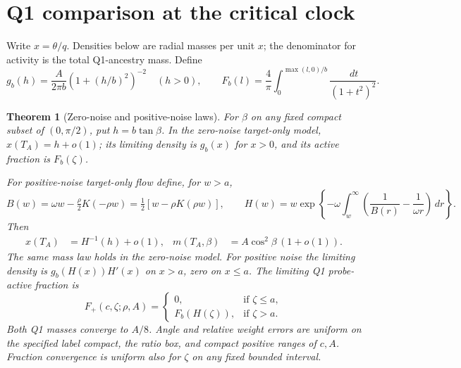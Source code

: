 \documentclass[11pt]{article}
\newtheorem{theorem}{Theorem}\newtheorem{lemma}{Lemma}
\newcommand{\dd}{\,d}\newcommand{\E}{\mathbb E}
\begin{document}
\section{Q1 comparison at the critical clock}\label{an04cfsv1:profiles}
Write \(x=\theta/q\). Densities below are radial masses per unit \(x\);
the denominator for activity is the total Q1-ancestry mass.
Define
\[
 g_b(h)=\frac{A}{2\pi b}\left(1+(h/b)^2\right)^{-2}\quad(h>0),
 \qquad
 F_b(l)=\frac4\pi\int_0^{\max(l,0)/b}\frac{\dd t}{(1+t^2)^2}.
\]
\begin{theorem}[Zero-noise and positive-noise laws]\label{an04cfsv1:laws}
For \(\beta\) on any fixed compact subset of \((0,\pi/2)\),
put \(h=b\tan\beta\). In the zero-noise target-only model,
\(x(T_A)=h+o(1)\); its limiting density is \(g_b(x)\) for \(x>0\),
and its active fraction is \(F_b(\zeta)\).

For positive-noise target-only flow define, for \(w>a\),
\[
 B(w)=\omega w-\tfrac\rho2K(-\rho w)
     =\tfrac12[w-\rho K(\rho w)],\qquad
 H(w)=w\exp\left\{-\omega\int_w^\infty
       \left(\frac1{B(r)}-\frac1{\omega r}\right)\dd r\right\}.
\]
Then
\begin{align}
 x(T_A)&=H^{-1}(h)+o(1),&
 m(T_A,\beta)&= A\cos^2\beta\,(1+o(1)).
 \label{an04cfsv1:positive}
\end{align}
The same mass law holds in the zero-noise model. For positive noise the
limiting density is \(g_b(H(x))H'(x)\) on \(x>a\), zero on \(x\le a\).
The limiting Q1 probe-active fraction is
\begin{equation}\label{an04cfsv1:active}
 F_+(c,\zeta;\rho,A)=
 \begin{cases}0,&\text{if }\zeta\le a,\\ F_b(H(\zeta)),&\text{if }\zeta>a.\end{cases}
\end{equation}
Both Q1 masses converge to \(A/8\). Angle and relative weight errors
are uniform on the specified label compact, the ratio box, and compact
positive ranges of \(c,A\). Fraction convergence is uniform also for
\(\zeta\) on any fixed bounded interval.
\end{theorem}
\end{document}

